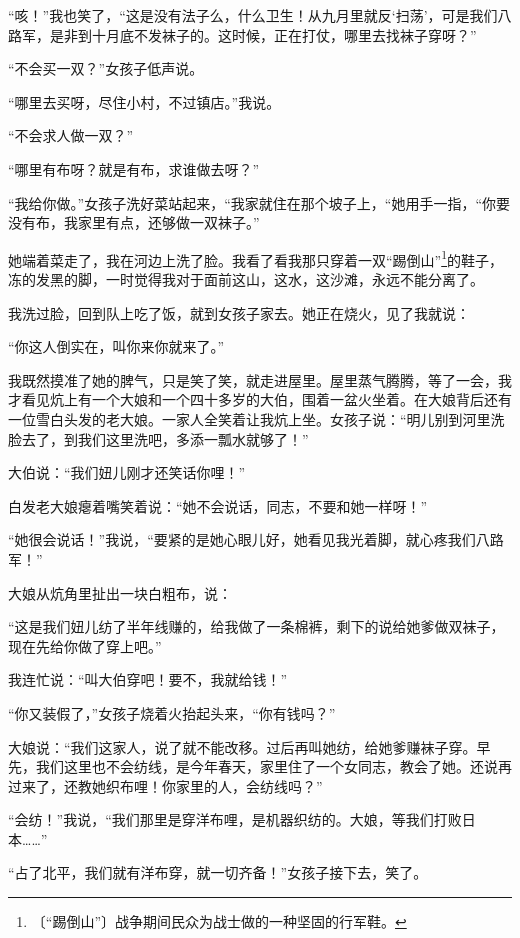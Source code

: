 \documentclass[12pt,UTF-8,openany]{ctexbook}
\begin{document}
\begin{normalsize}
    “咳！”我也笑了，“这是没有法子么，什么卫生！从九月里就反‘扫荡’，可是我们八路军，是非到十月底不发袜子的。这时候，正在打仗，哪里去找袜子穿呀？”
    
    “不会买一双？”女孩子低声说。
    
    “哪里去买呀，尽住小村，不过镇店。”我说。
    
    “不会求人做一双？”
    
    “哪里有布呀？就是有布，求谁做去呀？”
    
    “我给你做。”女孩子洗好菜站起来，“我家就住在那个坡子上，“她用手一指，“你要没有布，我家里有点，还够做一双袜子。”
    
    她端着菜走了，我在河边上洗了脸。我看了看我那只穿着一双“踢倒山”\footnote{〔“踢倒山”〕战争期间民众为战士做的一种坚固的行军鞋。}的鞋子，冻的发黑的脚，一时觉得我对于面前这山，这水，这沙滩，永远不能分离了。
    
    我洗过脸，回到队上吃了饭，就到女孩子家去。她正在烧火，见了我就说：
    
    “你这人倒实在，叫你来你就来了。”
    
    我既然摸准了她的脾气，只是笑了笑，就走进屋里。屋里蒸气腾腾，等了一会，我才看见炕上有一个大娘和一个四十多岁的大伯，围着一盆火坐着。在大娘背后还有一位雪白头发的老大娘。一家人全笑着让我炕上坐。女孩子说：“明儿别到河里洗脸去了，到我们这里洗吧，多添一瓢水就够了！”
    
    大伯说：“我们妞儿刚才还笑话你哩！”
    
    白发老大娘瘪着嘴笑着说：“她不会说话，同志，不要和她一样呀！”
    
    “她很会说话！”我说，“要紧的是她心眼儿好，她看见我光着脚，就心疼我们八路军！”
    
    大娘从炕角里扯出一块白粗布，说：
    
    “这是我们妞儿纺了半年线赚的，给我做了一条棉裤，剩下的说给她爹做双袜子，现在先给你做了穿上吧。”
    
    我连忙说：“叫大伯穿吧！要不，我就给钱！”
    
    “你又装假了，”女孩子烧着火抬起头来，“你有钱吗？”
    
    大娘说：“我们这家人，说了就不能改移。过后再叫她纺，给她爹赚袜子穿。早先，我们这里也不会纺线，是今年春天，家里住了一个女同志，教会了她。还说再过来了，还教她织布哩！你家里的人，会纺线吗？”
    
    “会纺！”我说，“我们那里是穿洋布哩，是机器织纺的。大娘，等我们打败日本……”
    
    “占了北平，我们就有洋布穿，就一切齐备！”女孩子接下去，笑了。
    

\end{normalsize}
\end{document}

